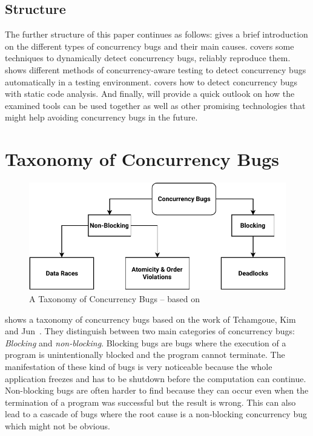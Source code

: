 \documentclass[conference]{IEEEtran}
\begin{document}
\subsection{Structure}

The further structure of this paper continues as follows:
 gives a brief introduction on the different types of concurrency bugs and their main causes.
 covers some techniques to dynamically detect concurrency bugs, reliably reproduce them.
 shows different methods of concurrency-aware testing to detect concurrency bugs automatically in a testing environment.
 covers how to detect concurrency bugs with static code analysis.
And finally,  will provide a quick outlook on how the examined tools can be used together as well as other promising technologies that might help avoiding concurrency bugs in the future.


\section{Taxonomy of Concurrency Bugs}
\label{sct:taxonomy}

\begin{figure}
    \includegraphics[width=\linewidth]{figures/ConcurrencyBugClasses.pdf}
    \caption{A Taxonomy of Concurrency Bugs -- based on\cite{tchamgoue2012testing}}
    \label{fig:classes}
\end{figure}

 shows a taxonomy of concurrency bugs based on the work of Tchamgoue, Kim and Jun~\cite{tchamgoue2012testing}.
They distinguish between two main categories of concurrency bugs: \emph{Blocking} and \emph{non-blocking}.
Blocking bugs are bugs where the execution of a program is unintentionally blocked and the program cannot terminate.
The manifestation of these kind of bugs is very noticeable because the whole application freezes and has to be shutdown before the computation can continue.
Non-blocking bugs are often harder to find because they can occur even when the termination of a program was successful but the result is wrong.
This can also lead to a cascade of bugs where the root cause is a non-blocking concurrency bug which might not be obvious.
\end{document}
